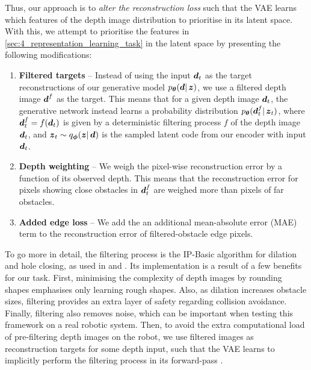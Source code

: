 Thus, our approach is to \textit{alter the reconstruction loss} such that the VAE learns which features of the depth image distribution to prioritise in its latent space. With this, we attempt to prioritise the features in \cref{sec:4_representation_learning_task} in the latent space by presenting the following modifications:
\begin{enumerate}
    \item \textbf{Filtered targets} -- Instead of using the input ${\boldsymbol{d}}_t$ as the target reconstructions of our generative model $p_{\boldsymbol{\theta}}({\boldsymbol{d}} |\, \boldsymbol{z})$, we use a filtered depth image ${\boldsymbol{d}}^f$ as the target. This means that for a given depth image ${\boldsymbol{d}}_t$, the generative network instead learns a probability distribution $p_{\boldsymbol{\theta}}({\boldsymbol{d}}^f_t |\, \boldsymbol{z}_t)$, where ${\boldsymbol{d}}^f_t = f({\boldsymbol{d}}_t)$ is given by a deterministic filtering process $f$ of the depth image ${\boldsymbol{d}}_t$, and ${\boldsymbol{z}}_t \sim q_{\boldsymbol{\phi}}(\boldsymbol{z} |\, {\boldsymbol{d}})$ is the sampled latent code from our encoder with input ${\boldsymbol{d}}_t$.
    \item \textbf{Depth weighting} -- We weigh the pixel-wise reconstruction error by a function of its observed depth. This means that the reconstruction error for pixels showing close obstacles in ${\boldsymbol{d}}^f_t$ are weighed more than pixels of far obstacles.
    \item \textbf{Added edge loss} -- We add the an additional mean-absolute error (MAE) term to the reconstruction error of filtered-obstacle edge pixels.
\end{enumerate}

To go more in detail, the filtering process is the IP-Basic algorithm \cite{filtering_depth_completion} for dilation and hole closing, as used in \cite{LearningStateRepresentation} and \cite{deepCollisionPredictorOracle}. Its implementation is a result of a few benefits for our task. First, minimising the complexity of depth images by rounding shapes emphasises only learning rough shapes. Also, as dilation increases obstacle sizes, filtering provides an extra layer of safety regarding collision avoidance. Finally, filtering also removes noise, which can be important when testing this framework on a real robotic system.
Then, to avoid the extra computational load of pre-filtering depth images on the robot, we use filtered images as reconstruction targets for some depth input, such that the VAE learns to implicitly perform the filtering process in its forward-pass \cite{LearningStateRepresentation}.

